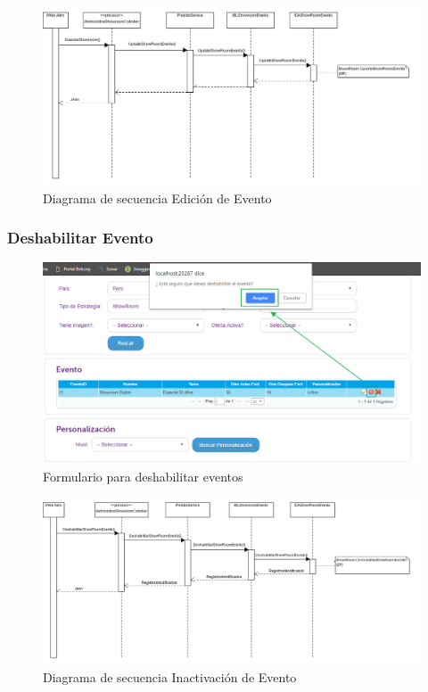 \documentclass[a4paper,11pt]{paper}
\begin{document}
\begin{landscape}
\begin{figure}[!h]
\centering
\includegraphics[width=1.5\textwidth]{imgs/Eventos/EditarEvento.png}
\caption{Diagrama de secuencia Edición de Evento}
\end{figure}
\end{landscape} 




\newpage
\subsubsection{Deshabilitar Evento}

\begin{figure}[h]
\centering
\includegraphics[width=1.0\textwidth]{imgs/Eventos/FormularioDeshabilitarEvento.png}
\caption{Formulario para deshabilitar eventos}
\end{figure}


\begin{landscape}
\begin{figure}[!h]
\centering
\includegraphics[width=1.5\textwidth]{imgs/Eventos/DeshabilitarEvento.png}
\caption{Diagrama de secuencia Inactivación de Evento}
\end{figure}
\end{landscape} 
\end{document}
